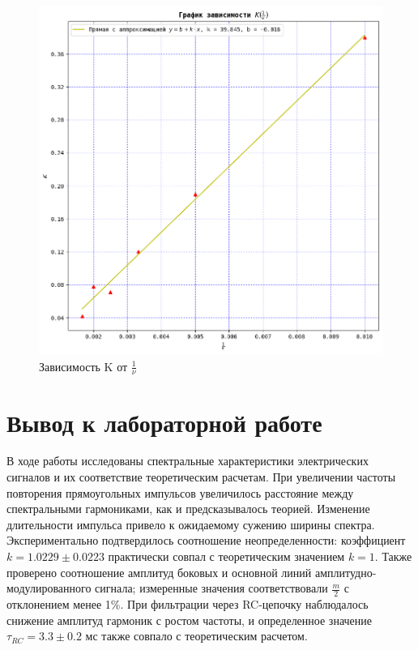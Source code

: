 \documentclass[a4paper,12pt]{article}
\theoremstyle{definition}
\begin{document}
\begin{figure}[h!]
    \centering
    \includegraphics[width=15cm]{grafic4.png}
    \caption{Зависимость K от $\frac{1}{\nu}$}
    \label{fig:RC}
\end{figure}

\section{Вывод к лабораторной работе}

В ходе работы исследованы спектральные характеристики электрических сигналов и их соответствие теоретическим расчетам. При увеличении частоты повторения прямоугольных импульсов увеличилось расстояние между спектральными гармониками, как и предсказывалось теорией. Изменение длительности импульса привело к ожидаемому сужению ширины спектра. Экспериментально подтвердилось соотношение неопределенности: коэффициент $k = 1.0229 \pm 0.0223$ практически совпал с теоретическим значением $k = 1$. Также проверено соотношение амплитуд боковых и основной линий амплитудно-модулированного сигнала; измеренные значения соответствовали $\frac{m}{2}$ с отклонением менее 1\%. При фильтрации через RC-цепочку наблюдалось снижение амплитуд гармоник с ростом частоты, и определенное значение $\tau_{RC} = 3.3 \pm 0.2$ мс также совпало с теоретическим расчетом.
\end{document}

